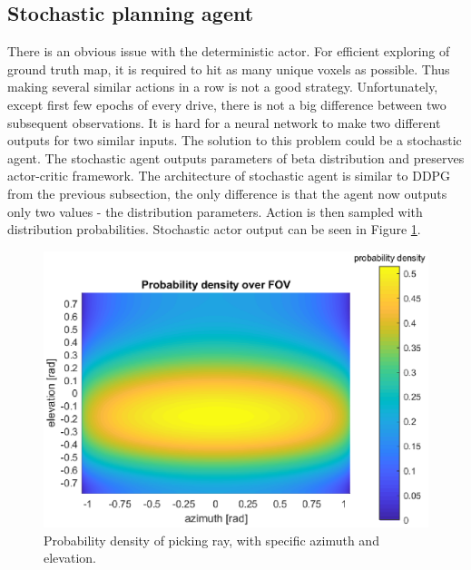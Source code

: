 \subsection{Stochastic planning agent}
There is an obvious issue with the deterministic actor. For efficient exploring of ground truth map, it is required to hit as many unique voxels as possible. Thus making several similar actions in a row is not a good strategy. Unfortunately, except first few epochs of every drive, there is not a big difference between two subsequent observations. It is hard for a neural network to make two different outputs for two similar inputs. The solution to this problem could be a stochastic agent. The stochastic agent outputs parameters of beta distribution and preserves actor-critic framework. The architecture of stochastic agent is similar to DDPG from the previous subsection, the only difference is that the agent now outputs only two values - the distribution parameters. Action is then sampled with distribution probabilities. Stochastic actor output can be seen in Figure \ref{fig:stochaction}.

\clearpage

\begin{figure}[H]
\centering
\includegraphics[width=0.9\linewidth]{fig/betapdf.eps}
\caption[Example of stochastic actor output]{Probability density of picking ray, with specific azimuth and elevation.}
\label{fig:stochaction}
\end{figure}

